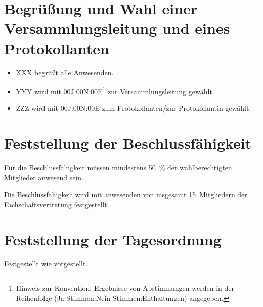 \documentclass[sitzung=fsv-konstituierend]{fsphys-protokoll}
\begin{document}
	
\section{Begrüßung und Wahl einer Versammlungsleitung und eines Protokollanten}
\begin{itemize}
	\item XXX begrüßt alle Anwesenden.
	\item YYY wird mit 00J:00N:00E\footnote{Hinweis zur Konvention: Ergebnisse von Abstimmungen werden in der Reihenfolge (Ja-Stimmen:Nein-Stimmen:Enthaltungen) angegeben.} zur Versammlungsleitung gewählt.
	\item ZZZ wird mit 00J:00N:00E zum Protokollanten/zur Protokollantin gewählt.
\end{itemize}

\section{Feststellung der Beschlussfähigkeit}
Für die Beschlussfähigkeit müssen mindestens \SI{50}{\percent} der wahlberechtigten Mitglieder anwesend sein.

Die Beschlussfähigkeit wird mit {\protokollanzahlanwesend} anwesenden von insgesamt 15~Mitgliedern der Fachschaftsvertretung festgestellt.

\section{Feststellung der Tagesordnung}
Festgestellt wie vorgestellt.
\end{document}
